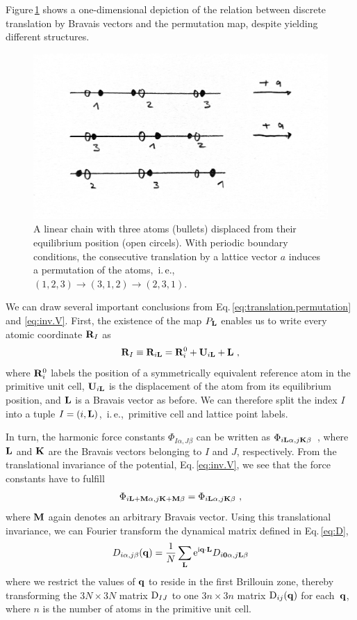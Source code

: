 Figure\,\ref{fig:translation.permutation} shows a one-dimensional depiction of the relation between discrete translation by Bravais vectors and the permutation map, despite yielding different structures.
\begin{figure}[h]
	\centering
	\includegraphics[width=.68\textwidth]{./sketches/permutation1.jpg}
	\caption{A linear chain with three atoms (bullets) displaced from their equilibrium position (open circels). With periodic boundary conditions, the consecutive translation by a lattice vector $a$ induces a permutation of the atoms,~i.\,e.,~$(1, 2 , 3) \to (3, 1, 2) \to (2, 3, 1)$.}
	\label{fig:translation.permutation}
\end{figure}

We can draw several important conclusions from Eq.\,\eqref{eq:translation.permutation} and \eqref{eq:inv.V}. First, the existence of the map $P_{\bf L}$ enables us to write every atomic coordinate ${\bf R}_I$ as
\begin{align}
	{\bf R}_I \equiv {\bf R}_{i {\bf L}} 
		= {\bf R}^0_i + {\bf U}_{i {\bf L}} + {\bf L}~,
	\label{eq:R_iL}
\end{align}
where ${\bf R}^0_i$ labels the position of a symmetrically equivalent reference atom in the primitive unit cell, ${\bf U}_{i {\bf L}}$ is the displacement of the atom from its equilibrium position, and $\bf L$ is a Bravais vector as before.
We can therefore split the index $I$ into a tuple $I = (i, {\bf L})$,~i.\,e.,~primitive cell and lattice point labels.

In turn, the harmonic force constants $\Phi_{I \alpha, J \beta}$ can be written as $\Phi_{i {\bf L} \alpha, j {\bf K} \beta}$~, where $\bf L$ and ${\bf K}$ are the Bravais vectors belonging to $I$ and $J$, respectively. From the translational invariance of the potential, Eq.\,\eqref{eq:inv.V}, we see that the force constants have to fulfill
\begin{align}
	\Phi_{i {\bf L} + {\bf M} \alpha, j {\bf K} + {\bf M} \beta} 
		= \Phi_{i {\bf L} \alpha, j {\bf K} \beta}~,
\end{align}
where ${\bf M}$ again denotes an arbitrary Bravais vector. Using this translational invariance, we can Fourier transform the dynamical matrix defined in Eq.\,\eqref{eq:D},
\begin{align}
	D_{i \alpha, j \beta} ({\bf q}) 
		= \frac{1}{N} \sum_{{\bf L}} {\rm e}^{{\rm i} {\bf q} \cdot {\bf L}} D_{i {\bf 0} \alpha, j {\bf L} \beta}
	\label{eq:D(q)}
\end{align}
where we restrict the values of ${\bf q}$ to reside in the first Brillouin zone, thereby transforming the $3N \times 3N$ matrix ${\rm D}_{IJ}$ to one $3n \times 3n$ matrix ${\rm D}_{ij} (\bf q)$ for each~${\bf q}$, where $n$ is the number of atoms in the primitive unit cell.


